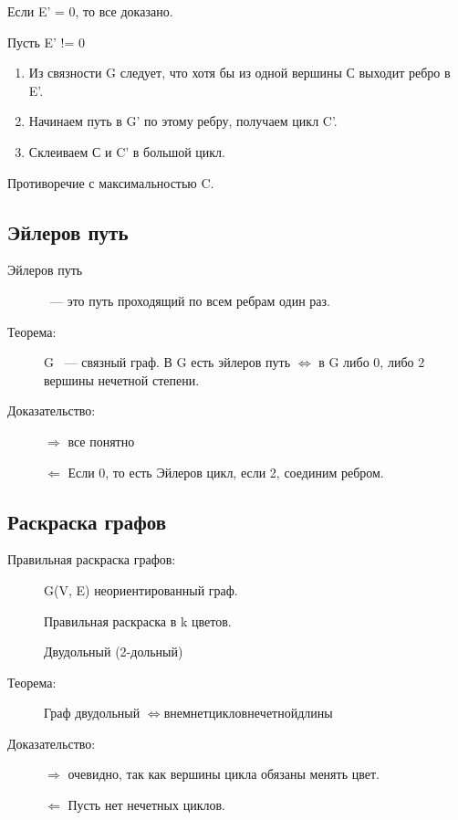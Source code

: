 \documentclass[12pt]{article}
\begin{document}
\begin{description}
\begin{description}
Если E' = 0, то все доказано. 

Пусть E' != 0

\begin{enumerate}
\item Из связности G следует, что хотя бы из одной вершины С выходит ребро в E'.
\item Начинаем путь в G' по этому ребру, получаем цикл C'.
\item Склеиваем С и C' в большой цикл. 
\end{enumerate}

Противоречие с максимальностью C.
\end{description}

\subsection{Эйлеров путь}
\begin{description}

\item [Эйлеров путь] ~--- это путь проходящий по всем ребрам один раз. 

\item [Теорема:] G ~--- связный граф. В G есть эйлеров путь $\Leftrightarrow$ в G либо 0, либо 2 вершины нечетной степени. 

\item [Доказательство:] $\Rightarrow$ все понятно

$\Leftarrow$ Если 0, то есть Эйлеров цикл, если 2, соединим ребром. 
\end{description}

\subsection{Раскраска графов}


\begin{description}
\item[Правильная раскраска графов:] G(V, E) неориентированный граф. 

Правильная раскраска в k цветов.

Двудольный (2-дольный)
\item[Теорема:] Граф двудольный $\Leftrightarrow в нем нет циклов нечетной длины$

\item[Доказательство:] $\Rightarrow$ очевидно, так как вершины цикла обязаны менять цвет. 

$\Leftarrow$ Пусть нет нечетных циклов. 


\end{description}
\end{description}
\end{document}
